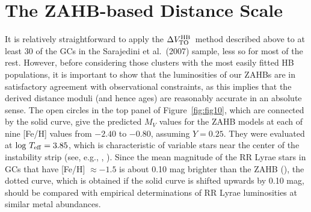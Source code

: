 \documentclass[12pt,preprint]{aastex}
\newcommand\teff{{T_{\rm eff}}}
\newcommand\delv{\Delta V^{\rm HB}_{\rm TO}}
\begin{document}
\section{The ZAHB-based Distance Scale}
\label{sec:zahbdis}

It is relatively straightforward to apply the $\delv$\ method described above
to at least 30 of the GCs in the Sarajedini et al.~(2007) sample, less so for
most of the rest.  However, before considering those clusters with the most 
easily fitted HB populations, it is important to show that the luminosities of
our ZAHBs are in satisfactory agreement with observational constraints, as this
implies that the derived distance moduli (and hence ages) are reasonably
accurate in an absolute sense.  The open circles in the top panel of
Figure~\ref{fig:fig10}, which are connected by the solid curve, give the
predicted $M_V$ values for the ZAHB models at each of nine [Fe/H] values from
$-2.40$ to $-0.80$, assuming $Y = 0.25$.  They were evaluated at $\log\,\teff =
3.85$, which is characteristic of variable stars near the center of the
instability strip (see, e.g., \citealt{san90a}, \citealt{cac13}).  Since the
mean magnitude of the RR Lyrae stars in GCs that have [Fe/H] $\approx -1.5$ is
about 0.10 mag brighter than the ZAHB (\citealt{san93}), the dotted curve,
which is obtained if the solid curve is shifted upwards by 0.10 mag, should
be compared with empirical determinations of RR Lyrae luminosities at similar
metal abundances.
\end{document}
